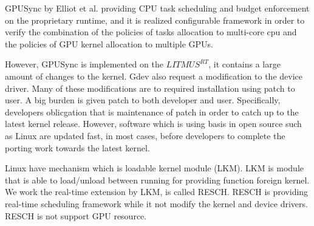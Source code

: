 GPUSync\cite{elliott:gpusync13,elliott:explor14} by Elliot et al. providing CPU task scheduling and budget enforcement on the proprietary runtime,
and it is realized configurable framework in order to verify the combination of the policies of tasks allocation to multi-core cpu and the policies of GPU kernel allocation to multiple GPUs.

However, GPUSync is implemented on the $LITMUS^{RT}$\cite{litmus}, it contains a large amount of changes to the kernel.
Gdev also request a modification to the device driver.
Many of these modifications are to required installation using patch to user.
A big burden is given patch to both developer and user.
Specifically, developers oblicgation that is maintenance of patch in order to catch up to the latest kernel release.
However, software which is using basis in open source such as Linux are updated fast,
in most cases, before developers to complete the porting work towards the latest kernel.

Linux have mechanism which is loadable kernel module (LKM).
LKM is module that is able to load/unload between running for providing function foreign kernel.
We work the real-time extension by LKM, is called RESCH.
RESCH is providing real-time scheduling framework while it not modify the kernel and device drivers.
RESCH is not support GPU resource.



